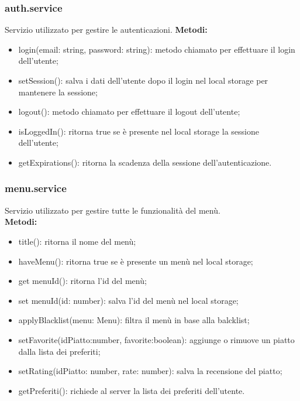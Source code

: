 \subsubsection{auth.service}
Servizio utilizzato per gestire le autenticazioni.
\textbf{Metodi:}
\begin{itemize}
    \item login(email: string, password: string): metodo chiamato per effettuare il login dell'utente;
    \item setSession(): salva i dati dell'utente dopo il login nel local storage per mantenere la sessione;
    \item logout(): metodo chiamato per effettuare il logout dell'utente;
    \item isLoggedIn(): ritorna true se è presente nel local storage la sessione dell'utente;
    \item getExpirations(): ritorna la scadenza della sessione dell'autenticazione.
\end{itemize}

\subsubsection{menu.service}
Servizio utilizzato per gestire tutte le funzionalità del menù.\\
\textbf{Metodi:}
\begin{itemize}
    \item title(): ritorna il nome del menù;
    \item haveMenu(): ritorna true se è presente un menù nel local storage;
    \item get menuId(): ritorna l'id del menù;
    \item set menuId(id: number): salva l'id del menù nel local storage;
    \item applyBlacklist(menu: Menu): filtra il menù in base alla balcklist;
    \item setFavorite(idPiatto:number, favorite:boolean): aggiunge o rimuove un piatto dalla lista dei preferiti;
    \item  setRating(idPiatto: number, rate: number): salva la recensione del piatto;
    \item getPreferiti(): richiede al server la lista dei preferiti dell'utente.
\end{itemize}

